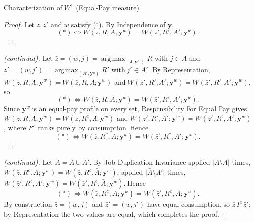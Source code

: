 \documentclass[10pt]{beamer}
\DeclareMathOperator*{\argmax}{arg\,max}
\begin{document}
\begin{frame}[allowframebreaks]{Characterization of $W^1$ (Equal-Pay measure)}
\begin{proof}
Let $z,z'$ and $w$ satisfy (*). By Independence of
$\mathbf y$,
\begin{equation*}
(*)\Leftrightarrow W(z,R,A;\mathbf y^w)=W(z',R',A';\mathbf y^w).
\end{equation*}
\end{proof}
\framebreak
\begin{proof}[(continued)]
Let $\bar z=(w,j)=\argmax_{(A,\mathbf y^w)}R$ with $j\in A$ and
$\bar z'=(w,j')=\argmax_{(A',\mathbf y^w)}R'$ with $j'\in A'$. By
Representation, $W(z,R,A;\mathbf y^w)=W(\bar z,R,A;\mathbf y^w)$ and
$W(z',R',A';\mathbf y^w)=W(\bar z',R',A';\mathbf y^w)$, so
\begin{equation*}
(*)\Leftrightarrow W(\bar z,R,A;\mathbf y^w)=W(\bar z',R',A';\mathbf y^w).
\end{equation*}
Since $\mathbf y^w$ is an equal-pay profile on every set, Responsibility For
Equal Pay gives $W(\bar z,R,A;\mathbf y^w)=W(\bar z,R^c,A;\mathbf y^w)$ and
$W(\bar z',R',A';\mathbf y^w)=W(\bar z',R^c,A';\mathbf y^w)$, where $R^c$ ranks
purely by consumption. Hence
\begin{equation*}
(*)\Leftrightarrow W(\bar z,R^c,A;\mathbf y^w)=W(\bar z',R^c,A';\mathbf y^w).
\end{equation*}
\end{proof}
\framebreak
\begin{proof}[(continued)]
Let $\bar A=A\cup A'$. By Job Duplication Invariance applied
$\lvert\bar A\setminus A\rvert$ times,
$W(\bar z,R^c,A;\mathbf y^w)=W(\bar z,R^c,\bar A;\mathbf y^w)$; applied
$\lvert\bar A\setminus A'\rvert$ times,
$W(\bar z',R^c,A';\mathbf y^w)=W(\bar z',R^c,\bar A;\mathbf y^w)$. Hence
\begin{equation*}
(*)\Leftrightarrow W(\bar z,R^c,\bar A;\mathbf y^w)=W(\bar z',R^c,\bar
A;\mathbf y^w).
\end{equation*}
By construction $\bar z=(w,j)$ and $\bar z'=(w,j')$ have equal consumption, so
$\bar z\,I^c\,\bar z'$; by Representation the two values are equal, which
completes the proof.
\end{proof}

\medskip
\hyperlink{tab:classification}{}
\end{frame}
\end{document}
